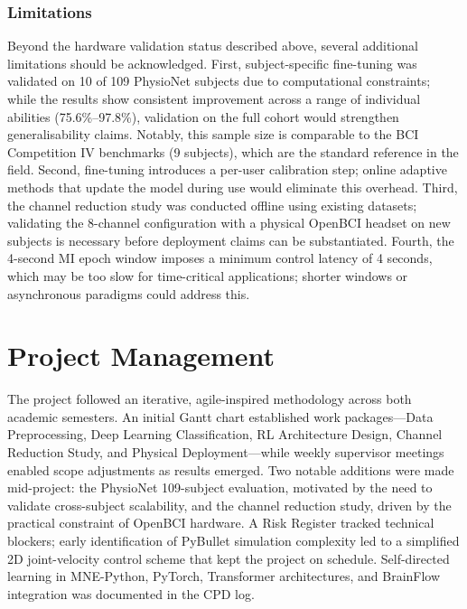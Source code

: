 \documentclass[12pt, a4paper]{article}
\begin{document}
\subsubsection{Limitations}
\label{sec:disc_limitations}

Beyond the hardware validation status described above, several additional limitations should be acknowledged. First, subject-specific fine-tuning was validated on 10 of 109 PhysioNet subjects due to computational constraints; while the results show consistent improvement across a range of individual abilities (75.6\%--97.8\%), validation on the full cohort would strengthen generalisability claims. Notably, this sample size is comparable to the BCI Competition IV benchmarks (9 subjects), which are the standard reference in the field. Second, fine-tuning introduces a per-user calibration step; online adaptive methods that update the model during use would eliminate this overhead. Third, the channel reduction study was conducted offline using existing datasets; validating the 8-channel configuration with a physical OpenBCI headset on new subjects is necessary before deployment claims can be substantiated. Fourth, the 4-second MI epoch window imposes a minimum control latency of 4 seconds, which may be too slow for time-critical applications; shorter windows or asynchronous paradigms could address this.

\section{Project Management}

The project followed an iterative, agile-inspired methodology across both academic semesters. An initial Gantt chart established work packages---Data Preprocessing, Deep Learning Classification, RL Architecture Design, Channel Reduction Study, and Physical Deployment---while weekly supervisor meetings enabled scope adjustments as results emerged. Two notable additions were made mid-project: the PhysioNet 109-subject evaluation, motivated by the need to validate cross-subject scalability, and the channel reduction study, driven by the practical constraint of OpenBCI hardware. A Risk Register tracked technical blockers; early identification of PyBullet simulation complexity led to a simplified 2D joint-velocity control scheme that kept the project on schedule. Self-directed learning in MNE-Python, PyTorch, Transformer architectures, and BrainFlow integration was documented in the CPD log.
\end{document}
